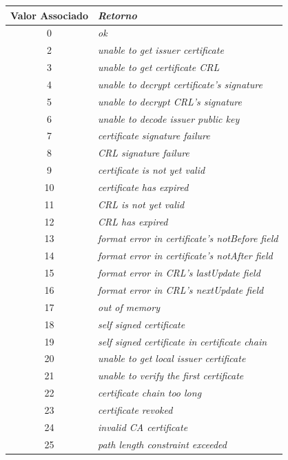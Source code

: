 	\begin{center}
		\begin{longtable}{c>{\em}l}
		\toprule
		\textbf{Valor Associado} & \textbf{Retorno} \\ \midrule
		0 & ok \\ 
		\rowcolor[gray]{0.9}
		2 & unable to get issuer certificate \\ 
		3 & unable to get certificate CRL \\ 
		\rowcolor[gray]{0.9}
		4 & unable to decrypt certificate's signature \\ 
		5 & unable to decrypt CRL's signature \\ 
		\rowcolor[gray]{0.9}
		6 & unable to decode issuer public key \\ 
		7 & certificate signature failure \\ 
		\rowcolor[gray]{0.9}
		8 & CRL signature failure \\ 
		9 & certificate is not yet valid \\ 
		\rowcolor[gray]{0.9}
		10 & certificate has expired \\ 
		11 & CRL is not yet valid \\ 
		\rowcolor[gray]{0.9}
		12 & CRL has expired \\ 
		13 & format error in certificate's notBefore field \\ 
		\rowcolor[gray]{0.9}
		14 & format error in certificate's notAfter field \\ 
		15 & format error in CRL's lastUpdate field \\ 
		\rowcolor[gray]{0.9}
		16 & format error in CRL's nextUpdate field \\ 
		17 & out of memory \\ 
		\rowcolor[gray]{0.9}
		18 & self signed certificate \\ 
		19 & self signed certificate in certificate chain \\ 
		\rowcolor[gray]{0.9}
		20 & unable to get local issuer certificate \\ 
		21 & unable to verify the first certificate \\ 
		\rowcolor[gray]{0.9}
		22 & certificate chain too long \\ 
		23 & certificate revoked \\ 
		\rowcolor[gray]{0.9}
		24 & invalid CA certificate \\ 
		25 & path length constraint exceeded \\ 

\end{longtable}
\end{center}
